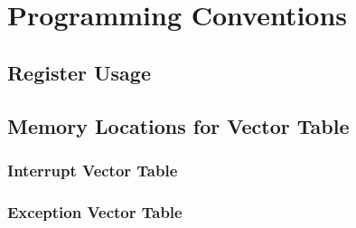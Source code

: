 \documentclass[letterpaper]{article}
\begin{document}
\section{Programming Conventions}
\subsection{Register Usage}
\subsection{Memory Locations for Vector Table}
\subsubsection{Interrupt Vector Table}
\subsubsection{Exception Vector Table}
\end{document}
